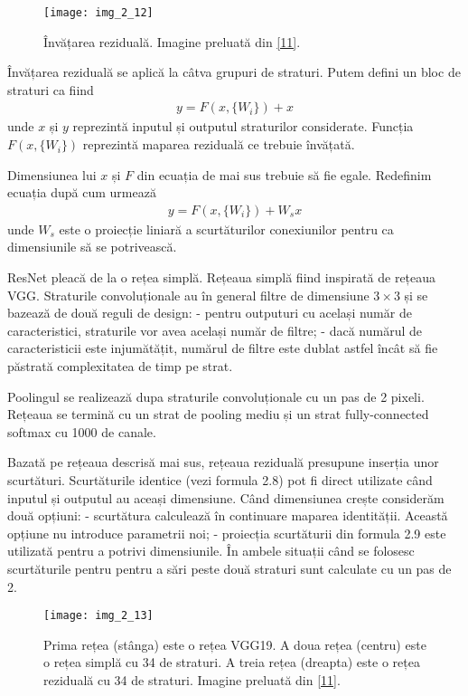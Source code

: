 \begin{figure}[!h]
	\centering
	\texttt{[image: img\_2\_12]}
	\caption[Învățarea reziduală]{Învățarea reziduală. Imagine preluată din \hyperlink{KaimingHeXiangyuZhangShaoqingRenJianSun}{[11]}.}
\end{figure}  

Învățarea reziduală se aplică la câtva grupuri de straturi. Putem defini un bloc de straturi ca fiind 
\begin{align}
	y = F(x,\{W_i\}) + x
\end{align}
unde $x$ și $y$ reprezintă inputul și outputul straturilor considerate. Funcția $F(x, \{W_i\})$ reprezintă maparea reziduală ce trebuie învățată.

Dimensiunea lui $x$ și $F$ din ecuația de mai sus trebuie să fie egale. Redefinim ecuația după cum urmează
\begin{align}
	y = F(x,\{W_i\}) + W_sx
\end{align}
unde $W_s$ este o proiecție liniară a scurtăturilor conexiunilor pentru ca dimensiunile să se potrivească.

ResNet pleacă de la o rețea simplă. Rețeaua simplă fiind inspirată de rețeaua VGG. Straturile convoluționale au în general filtre de dimensiune $3\times3$ și se bazează de două reguli de design: - pentru outputuri cu același număr de caracteristici, straturile vor avea același număr de filtre; - dacă numărul de caracteristicii este injumătățit, numărul de filtre este dublat astfel încât să fie păstrată complexitatea de timp pe strat.

Poolingul se realizează dupa straturile convoluționale cu un pas de 2 pixeli. Rețeaua se termină cu un strat de pooling mediu și un strat fully-connected softmax cu 1000 de canale.

Bazată pe rețeaua descrisă mai sus, rețeaua reziduală presupune inserția unor scurtături. Scurtăturile identice (vezi formula 2.8) pot fi direct utilizate când inputul și outputul au aceași dimensiune. Când dimensiunea crește considerăm două opțiuni: - scurtătura calculează în continuare maparea identității. Această opțiune nu introduce parametrii noi; - proiecția scurtăturii din formula 2.9 este utilizată pentru a potrivi dimensiunile. În ambele situații când se folosesc scurtăturile pentru pentru a sări peste două straturi sunt calculate cu un pas de 2.

\begin{figure}[!h]
	\centering
	\texttt{[image: img\_2\_13]}
	\caption[Rețeaua ResNet]{Prima rețea (stânga) este o rețea VGG19. A doua rețea (centru) este o rețea simplă cu 34 de straturi. A treia rețea (dreapta) este o rețea reziduală cu 34 de straturi. Imagine preluată din \hyperlink{KaimingHeXiangyuZhangShaoqingRenJianSun}{[11]}.}
\end{figure}  


